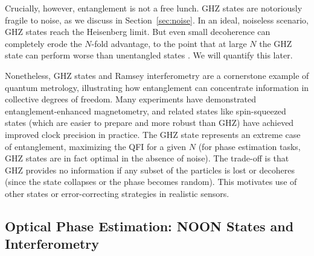 Crucially, however, entanglement is not a free lunch. GHZ states are
notoriously fragile to noise, as we discuss in
Section~\ref{sec:noise}. In an ideal, noiseless scenario, GHZ states
reach the Heisenberg limit. But even small decoherence can completely
erode the $N$-fold advantage, to the point that at large $N$ the GHZ
state can perform worse than unentangled states \cite{Huelga1997}. We
will quantify this later.



Nonetheless, GHZ states and Ramsey interferometry are a cornerstone
example of quantum metrology, illustrating how entanglement can
concentrate information in collective degrees of freedom. Many
experiments have demonstrated entanglement-enhanced magnetometry, and
related states like spin-squeezed states (which are easier to prepare
and more robust than GHZ) have achieved improved clock precision in
practice. The GHZ state represents an extreme case of entanglement,
maximizing the QFI for a given $N$ (for phase estimation tasks, GHZ
states are in fact optimal in the absence of noise). The trade-off is
that GHZ provides no information if any subset of the particles is
lost or decoheres (since the state collapses or the phase becomes
random). This motivates use of other states or error-correcting
strategies in realistic sensors.



\subsection{Optical Phase Estimation: NOON States and Interferometry}



